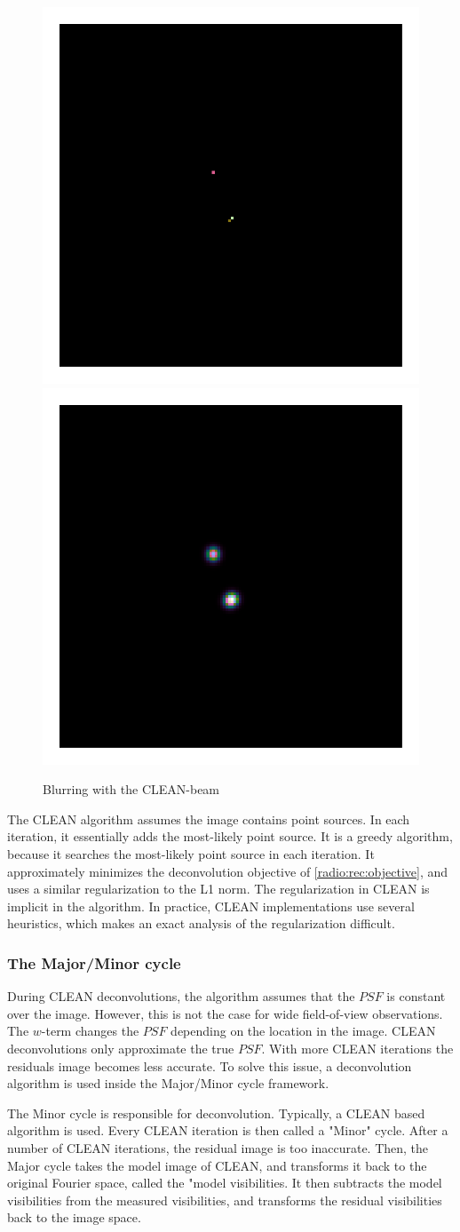 \begin{figure}[h]
	\centering
	\includegraphics[width=0.25\linewidth, clip, trim= 1.0in 1.0in 1.0in 1.0in]{./chapters/01.intro/cleanExample/model_CLEAN_3.png}
	\includegraphics[width=0.25\linewidth, clip, trim= 1.0in 1.0in 1.0in 1.0in]{./chapters/01.intro/cleanExample/rec_CLEAN.png}
	\caption{Blurring with the CLEAN-beam}
	\label{radio:clean:beam}
\end{figure}

The CLEAN algorithm assumes the image contains point sources. In each iteration, it essentially adds the most-likely point source. It is a greedy algorithm, because it searches the most-likely point source in each iteration. It approximately minimizes the deconvolution objective of \eqref{radio:rec:objective}, and uses a similar regularization to the L1 norm. The regularization in CLEAN is implicit in the algorithm. In practice, CLEAN implementations use several heuristics, which makes an exact analysis of the regularization difficult.

\subsubsection{The Major/Minor cycle}\label{intro2:opt:cycle}
During CLEAN deconvolutions, the algorithm assumes that the $PSF$ is constant over the image. However, this is not the case for wide field-of-view observations. The $w$-term changes the $PSF$ depending on the location in the image. CLEAN deconvolutions only approximate the true $PSF$. With more CLEAN iterations the residuals image becomes less accurate. To solve this issue, a deconvolution algorithm is used inside the Major/Minor cycle framework. 

The Minor cycle is responsible for deconvolution. Typically, a CLEAN based algorithm is used. Every CLEAN iteration is then called a "Minor" cycle. After a number of CLEAN iterations, the residual image is too inaccurate. Then, the Major cycle takes the model image of CLEAN, and transforms it back to the original Fourier space, called the "model visibilities. It then subtracts the model visibilities from the measured visibilities, and transforms the residual visibilities back to the image space.

